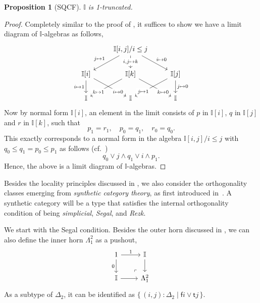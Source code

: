 \documentclass[12pt]{amsart}
\newtheorem{proposition}[theorem]{Proposition}
\theoremstyle{definition}
\newcommand{\mbb}[1]{\mathbb{#1}}
\newcommand{\I}{\mbb I}
\newcommand{\ms}[1]{\mathsf{#1}}
\newcommand{\scomp}[2]{\{\,#1\mid#2\,\}}
\begin{document}
\begin{proposition}[SQCF]\label{specis1t}
  $\I$ is 1-truncated.
\end{proposition}
\begin{proof}
  Completely similar to the proof of , it suffices to show we have a limit diagram of $\I$-algebras as follows,
  \[\begin{tikzcd}
    & {\I[i,j]/i\le j} \\
    \I[i] & \I[k] & \I[j] \\
    \I & \I & \I
    \arrow["{j \mapsto 1}"', from=1-2, to=2-1]
    \arrow["{i,j \mapsto k}"{description}, from=1-2, to=2-2]
    \arrow["{i \mapsto 0}", from=1-2, to=2-3]
    \arrow["i \mapsto 1"', from=2-1, to=3-1]
    \arrow["i \mapsto 0"{description, pos=0.75}, from=2-1, to=3-2]
    \arrow["k \mapsto 1"{description, pos=0.75}, from=2-2, to=3-1]
    \arrow["k \mapsto 0"{description, pos=0.75}, from=2-2, to=3-3]
    \arrow["j \mapsto 1"{description, pos=0.75}, from=2-3, to=3-2]
    \arrow["j \mapsto 0", from=2-3, to=3-3]
  \end{tikzcd}\]
  Now by normal form $\I[i]$, an element in the limit consists of $p$ in $\I[i]$, $q$ in $\I[j]$ and $r$ in $\I[k]$, such that
  \[ p_1 = r_1, \quad p_0 = q_1, \quad r_0 = q_0. \]
  This exactly corresponds to a normal form in the algebra $\I[i,j]/i\le j$ with $q_0 \le q_1 = p_0 \le p_1$ as follows (cf.\ )
  \[ q_0 \vee j \wedge q_1 \vee i \wedge p_1. \]
  Hence, the above is a limit diagram of $\I$-algebras.
\end{proof}

Besides the locality principles discussed in , we also consider the orthogonality classes emerging from \emph{synthetic category theory}, as first introduced in~\cite{riehl2017type}. A synthetic category will be a type that satisfies the internal orthogonality condition of being \emph{simplicial}, \emph{Segal}, and \emph{Rezk}.

We start with the Segal condition. Besides the outer horn discussed in , we can also define the inner horn $\Lambda^2_1$ as a pushout,
\[
  \begin{tikzcd}
    1 \ar[d, "0"'] \ar[r, "1"] & \I \ar[d] \\
    \I \ar[r] & \Lambda^2_1
    \arrow["\lrcorner"{anchor=center, pos=0.125, rotate=180}, draw=none, from=2-2, to=1-1]
  \end{tikzcd}
\]
As a subtype of $\Delta_2$, it can be identified as $\scomp{(i,j) : \Delta_2}{\ms fi \vee \ms tj}$.
\end{document}
